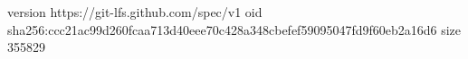 version https://git-lfs.github.com/spec/v1
oid sha256:ccc21ac99d260fcaa713d40eee70c428a348cbefef59095047fd9f60eb2a16d6
size 355829
